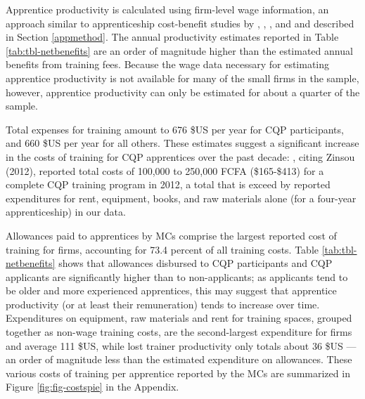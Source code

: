 \documentclass[
  a4paper, twoside, 12pt]{book}
\begin{document}
Apprentice productivity is calculated using firm-level wage information, an approach similar to apprenticeship cost-benefit studies by \textcite{wolter2015}, \textcite{muhlemann2018}, \textcite{bolli2020}, and \textcite{bolli2021} and described in Section \ref{appmethod}. The annual productivity estimates reported in Table \ref{tab:tbl-netbenefits} are an order of magnitude higher than the estimated annual benefits from training fees. Because the wage data necessary for estimating apprentice productivity is not available for many of the small firms in the sample, however, apprentice productivity can only be estimated for about a quarter of the sample.

Total expenses for training amount to 676 \$US per year for CQP participants, and 660 \$US per year for all others. These estimates suggest a significant increase in the costs of training for CQP apprentices over the past decade: \textcite{david-gnahoui2017}, citing Zinsou (2012), reported total costs of 100,000 to 250,000 FCFA (\$165-\$413) for a complete CQP training program in 2012, a total that is exceed by reported expenditures for rent, equipment, books, and raw materials alone (for a four-year apprenticeship) in our data.

Allowances paid to apprentices by MCs comprise the largest reported cost of training for firms, accounting for 73.4 percent of all training costs. Table \ref{tab:tbl-netbenefits} shows that allowances disbursed to CQP participants and CQP applicants are significantly higher than to non-applicants; as applicants tend to be older and more experienced apprentices, this may suggest that apprentice productivity (or at least their remuneration) tends to increase over time. Expenditures on equipment, raw materials and rent for training spaces, grouped together as non-wage training costs, are the second-largest expenditure for firms and average 111 \$US, while lost trainer productivity only totals about 36 \$US --- an order of magnitude less than the estimated expenditure on allowances. These various costs of training per apprentice reported by the MCs are summarized in Figure \ref{fig:fig-costspie} in the Appendix.
\end{document}
